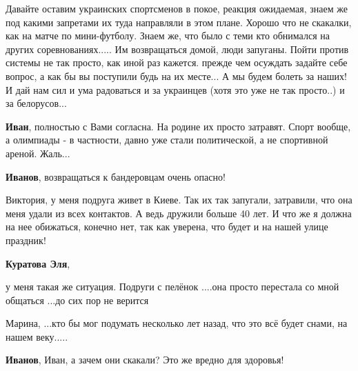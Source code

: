  
 
 
 
 
\zzSecCmt

\begin{itemize} %

Давайте оставим украинских спортсменов в покое, реакция ожидаемая, знаем же под
какими запретами их туда направляли в этом плане. Хорошо что не скакалки, как на
матче по мини-футболу. Знаем же, что было с теми кто обнимался на других
соревнованиях..... Им возвращаться домой, люди запуганы. Пойти против системы не
так просто, как иной раз кажется. прежде чем осуждать задайте себе вопрос, а как
бы вы поступили будь на их месте... А мы будем болеть за наших! И дай нам сил и
ума радоваться и за украинцев (хотя это уже не так просто..) и за белорусов...

\begin{itemize} %

\textbf{Иван}, полностью с Вами согласна. На родине их просто затравят. Спорт вообще, а
олимпиады - в частности, давно уже стали политической, а не спортивной ареной.
Жаль...

\textbf{Иванов}, возвращаться к бандеровцам очень опасно!


Виктория, у меня подруга живет в Киеве. Так их так запугали, затравили, что она
меня удали из всех контактов. А ведь дружили больше 40 лет. И что же я должна
на нее обижаться, конечно нет, так как уверена, что будет и на нашей улице
праздник!

\textbf{Куратова Эля},

у меня такая же ситуация. Подруги с пелёнок ....она просто перестала со мной
общаться ...до сих пор не верится


Марина, ...кто бы мог подумать несколько лет назад, что это всё будет снами, на
нашем веку.....

\textbf{Иванов}, Иван, а зачем они скакали? Это же вредно для здоровья!

\end{itemize} %


\end{itemize}
